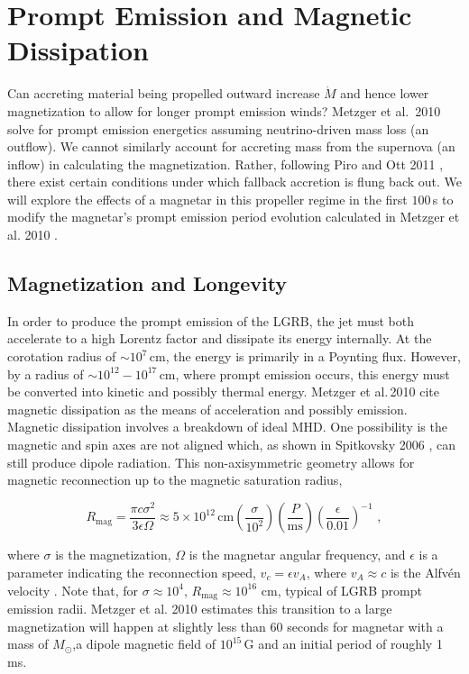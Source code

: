 \documentclass{article}
\begin{document}
\section{Prompt Emission and Magnetic Dissipation} \label{sec:prompt}
Can accreting material being propelled outward increase $\dot{M}$ and hence lower magnetization to allow for longer prompt emission winds?  Metzger et al.\ 2010 \cite{Metzger:2010pp} solve for prompt emission energetics assuming neutrino-driven mass loss (an outflow). We cannot similarly account for accreting mass from the supernova (an inflow) in calculating the magnetization. Rather, following Piro and Ott 2011 \cite {Piro:2011ed}, there exist certain conditions under which fallback accretion is flung back out. We will explore the effects of a magnetar in this propeller regime in the first $100$\,s to modify the magnetar's prompt emission period evolution calculated in  Metzger et al. 2010 \cite{Metzger:2010pp}.

\subsection{Magnetization and Longevity}

In order to produce the prompt emission of the LGRB, the jet must both accelerate to a high Lorentz factor and dissipate its energy internally. At the corotation radius of $\sim 10^7$\,cm, the energy is primarily in a Poynting flux. However, by a radius of $\sim 10^{12}- 10^{17}$\,cm, where prompt emission occurs, this energy must be converted into kinetic and possibly thermal energy.  Metzger et al.\,2010 \cite{Metzger:2010pp} cite  magnetic dissipation as the means of acceleration and possibly emission. Magnetic dissipation involves a breakdown of ideal MHD. One possibility is the magnetic and spin axes are not aligned which, as shown in Spitkovsky 2006 \cite{Spitkovsky:2006np}, can still produce dipole radiation. This non-axisymmetric geometry allows for magnetic reconnection up to the magnetic saturation radius,

\begin{equation}
  R_{\mathrm{mag}}=\frac{\pi c \sigma^2}{3 \epsilon \Omega}\approx 5 \times 10^{12}\, \mathrm{cm} \left(\frac{\sigma}{10^2}\right) \left(\frac{P}{\mathrm{ms}}\right)\left(\frac{\epsilon}{0.01}\right)^{-1}\,\,,
\end{equation}

where $\sigma$ is the magnetization, $\Omega$ is the magnetar angular frequency, and $\epsilon$ is a parameter indicating the reconnection speed, $v_c=\epsilon v_A$, where $v_A \approx c$ is the Alfv\'en velocity \cite{Metzger:2010pp}. Note that, for $\sigma\approx 10^4$, $R_{\mathrm{mag}} \approx 10^{16}$ cm, typical of LGRB prompt emission radii. Metzger et al. 2010 \cite{Metzger:2010pp} estimates this transition to a large magnetization will happen at slightly less than 60 seconds for magnetar with a mass of $M_{\odot}$,a dipole  magnetic field of $10^{15}$\,G and an initial period of roughly 1 ms.
\end{document}

